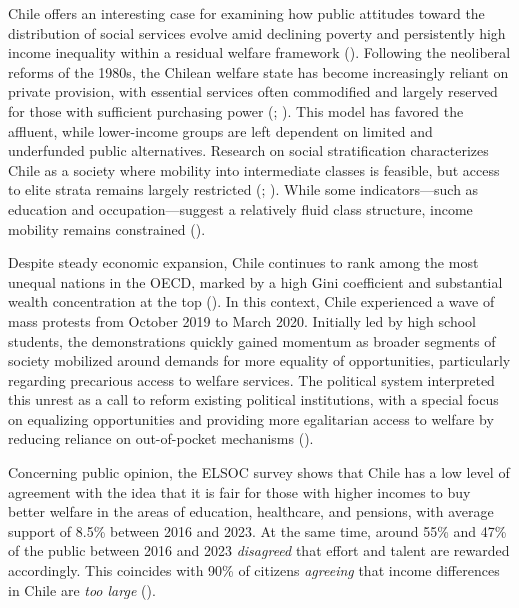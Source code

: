 \documentclass[
  12pt,
]{article}
\begin{document}
Chile offers an interesting case for examining how public attitudes
toward the distribution of social services evolve amid declining poverty
and persistently high income inequality within a residual welfare
framework (). Following
the neoliberal reforms of the 1980s, the Chilean welfare state has
become increasingly reliant on private provision, with essential
services often commodified and largely reserved for those with
sufficient purchasing power (; ). This model
has favored the affluent, while lower-income groups are left dependent
on limited and underfunded public alternatives. Research on social
stratification characterizes Chile as a society where mobility into
intermediate classes is feasible, but access to elite strata remains
largely restricted
(; ).
While some indicators---such as education and occupation---suggest a
relatively fluid class structure, income mobility remains constrained
().

Despite steady economic expansion, Chile continues to rank among the
most unequal nations in the OECD, marked by a high Gini coefficient and
substantial wealth concentration at the top
(). In this context,
Chile experienced a wave of mass protests from October 2019 to March
2020. Initially led by high school students, the demonstrations quickly
gained momentum as broader segments of society mobilized around demands
for more equality of opportunities, particularly regarding precarious
access to welfare services. The political system interpreted this unrest
as a call to reform existing political institutions, with a special
focus on equalizing opportunities and providing more egalitarian access
to welfare by reducing reliance on out-of-pocket mechanisms
().

Concerning public opinion, the ELSOC survey shows that Chile has a low
level of agreement with the idea that it is fair for those with higher
incomes to buy better welfare in the areas of education, healthcare, and
pensions, with average support of 8.5\% between 2016 and 2023. At the
same time, around 55\% and 47\% of the public between 2016 and 2023
\emph{disagreed} that effort and talent are rewarded accordingly. This
coincides with 90\% of citizens \emph{agreeing} that income differences
in Chile are \emph{too large}
().
\end{document}
